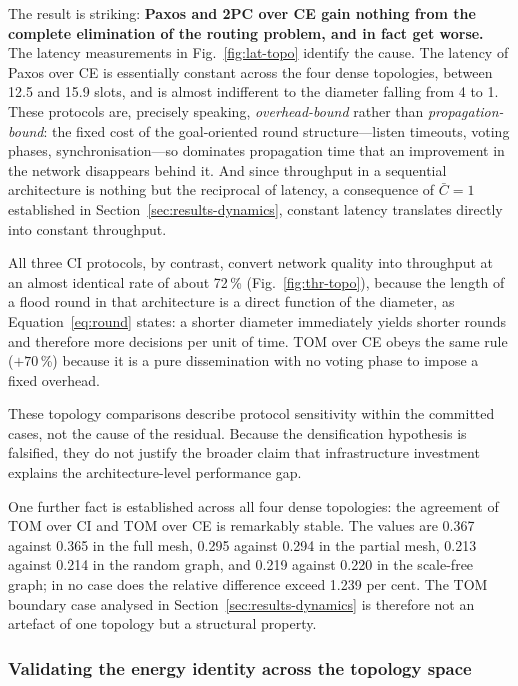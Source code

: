\documentclass[journal]{IEEEtran}
\newcommand{\CI}{CI}                      %
\newcommand{\CE}{CE}                      %
\newcommand{\Cdepth}{\bar{C}}             %
\begin{document}
The result is striking: \textbf{Paxos and 2PC over \CE{} gain nothing
from the complete elimination of the routing problem, and in fact get
worse.} The latency measurements in Fig.~\ref{fig:lat-topo} identify the
cause. The latency of Paxos
over \CE{} is essentially constant across the four dense topologies,
between 12.5 and 15.9 slots, and is almost indifferent to the diameter
falling from 4 to 1. These protocols are, precisely speaking,
\emph{overhead-bound} rather than \emph{propagation-bound}: the fixed cost
of the goal-oriented round structure---listen timeouts, voting phases,
synchronisation---so dominates propagation time that an improvement in the
network disappears behind it. And since throughput in a sequential
architecture is nothing but the reciprocal of latency, a consequence of
$\Cdepth = 1$ established in Section~\ref{sec:results-dynamics}, constant
latency translates directly into constant throughput.

All three \CI{} protocols, by contrast, convert network quality into
throughput at an almost identical rate of about 72\,\%
(Fig.~\ref{fig:thr-topo}), because the length
of a flood round in that architecture is a direct function of the
diameter, as Equation~\eqref{eq:round} states: a shorter diameter
immediately yields shorter rounds and therefore more decisions per unit of
time. TOM over \CE{} obeys the same rule ($+70$\,\%) because it is a pure
dissemination with no voting phase to impose a fixed overhead.

These topology comparisons describe protocol sensitivity within the
committed cases, not the cause of the residual. Because the densification
hypothesis is falsified, they do not justify the broader claim that
infrastructure investment explains the architecture-level performance gap.

One further fact is established across all four dense topologies: the
agreement of TOM over \CI{} and TOM over \CE{} is remarkably stable. The
values are 0.367 against 0.365 in the full mesh, 0.295 against 0.294 in
the partial mesh, 0.213 against 0.214 in the random graph, and 0.219
against 0.220 in the scale-free graph; in no case does the relative difference
exceed 1.239 per cent. The TOM boundary case analysed in
Section~\ref{sec:results-dynamics} is therefore not an artefact of one
topology but a structural property.

\subsubsection{Validating the energy identity across the topology space}
\end{document}
